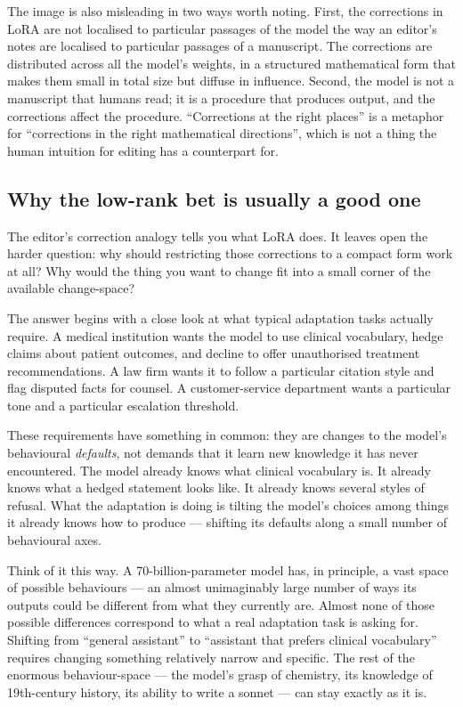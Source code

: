 The image is also misleading in two ways worth noting. First,
the corrections in LoRA are not localised to particular
passages of the model the way an editor's notes are localised
to particular passages of a manuscript. The corrections are
distributed across all the model's weights, in a structured
mathematical form that makes them small in total size but
diffuse in influence. Second, the model is not a manuscript
that humans read; it is a procedure that produces output, and
the corrections affect the procedure. ``Corrections at the
right places'' is a metaphor for ``corrections in the right
mathematical directions'', which is not a thing the human
intuition for editing has a counterpart for.

\subsection*{Why the low-rank bet is usually a good one}

The editor's correction analogy tells you what LoRA does. It leaves
open the harder question: why should restricting those corrections
to a compact form work at all? Why would the thing you want to
change fit into a small corner of the available change-space?

The answer begins with a close look at what typical adaptation
tasks actually require. A medical institution wants the model to
use clinical vocabulary, hedge claims about patient outcomes, and
decline to offer unauthorised treatment recommendations. A law firm
wants it to follow a particular citation style and flag disputed
facts for counsel. A customer-service department wants a particular
tone and a particular escalation threshold.

These requirements have something in common: they are changes to
the model's behavioural \emph{defaults}, not demands that it learn
new knowledge it has never encountered. The model already knows
what clinical vocabulary is. It already knows what a hedged
statement looks like. It already knows several styles of refusal.
What the adaptation is doing is tilting the model's choices
among things it already knows how to produce --- shifting its
defaults along a small number of behavioural axes.

Think of it this way. A 70-billion-parameter model has, in
principle, a vast space of possible behaviours --- an almost
unimaginably large number of ways its outputs could be different
from what they currently are. Almost none of those possible
differences correspond to what a real adaptation task is asking
for. Shifting from ``general assistant'' to ``assistant that
prefers clinical vocabulary'' requires changing something
relatively narrow and specific. The rest of the enormous
behaviour-space --- the model's grasp of chemistry, its knowledge
of 19th-century history, its ability to write a sonnet --- can
stay exactly as it is.

